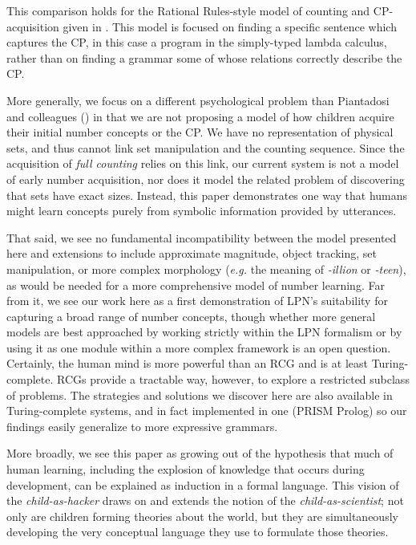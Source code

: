 \documentclass[10pt,letterpaper]{article}
\begin{document}
This comparison holds for the Rational Rules-style model of counting
and CP-acquisition given in \citep{PianGoodTen2012}. This model is
focused on finding a specific sentence which captures the CP, in this
case a program in the simply-typed lambda calculus, rather than on
finding a grammar some of whose relations correctly describe the CP.

More generally, we focus on a different psychological problem than
Piantadosi and colleagues (\citeyear{PianGoodTen2012}) in that we are
not proposing a model of how children acquire their initial number
concepts or the CP. We have no representation of physical sets, and
thus cannot link set manipulation and the counting sequence. Since the
acquisition of \emph{full counting} relies on this link, our current
system is not a model of early number acquisition, nor does it model
the related problem of discovering that sets have exact sizes.
Instead, this paper demonstrates one way that humans might learn
concepts purely from symbolic information provided by utterances.

That said, we see no fundamental incompatibility between the model
presented here and extensions to include approximate magnitude, object
tracking, set manipulation, or more complex morphology ({\it e.g.} the
meaning of \emph{-illion} or \emph{-teen}), as would be needed for a
more comprehensive model of number learning. Far from it, we see our
work here as a first demonstration of LPN's suitability for capturing
a broad range of number concepts, though whether more general models
are best approached by working strictly within the LPN formalism or by
using it as one module within a more complex framework is an open
question. Certainly, the human mind is more powerful than an RCG and
is at least Turing-complete. RCGs provide a tractable way, however, to
explore a restricted subclass of problems. The strategies and
solutions we discover here are also available in Turing-complete
systems, and in fact implemented in one (PRISM Prolog) so our findings
easily generalize to more expressive grammars.

More broadly, we see this paper as growing out of the hypothesis that
much of human learning, including the explosion of knowledge that
occurs during development, can be explained as induction in a formal
language. This vision of the \emph{child-as-hacker} draws on and
extends the notion of the \emph{child-as-scientist}; not only are
children forming theories about the world, but they are simultaneously
developing the very conceptual language they use to formulate those
theories.
\end{document}
